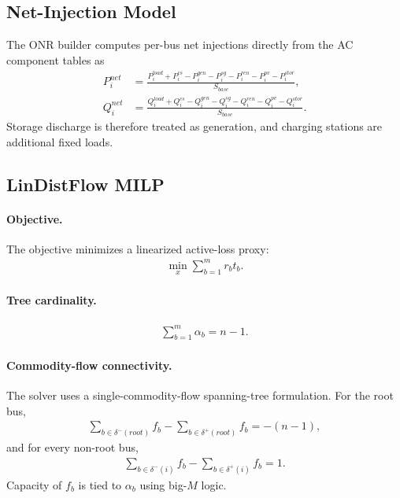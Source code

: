 \subsection{Net-Injection Model}

The ONR builder computes per-bus net injections directly from the AC component
tables as
\begin{align}
P_i^{net} &= \frac{P_i^{load} + P_i^{cs} - P_i^{gen} - P_i^{sg} - P_i^{ren} - P_i^{pv} - P_i^{stor}}{S_{base}}, \\
Q_i^{net} &= \frac{Q_i^{load} + Q_i^{cs} - Q_i^{gen} - Q_i^{sg} - Q_i^{ren} - Q_i^{pv} - Q_i^{stor}}{S_{base}}.
\end{align}
Storage discharge is therefore treated as generation, and charging stations are
additional fixed loads.

\subsection{LinDistFlow MILP}

\paragraph{Objective.}
The objective minimizes a linearized active-loss proxy:
\begin{align}
\min_x \sum_{b=1}^{m} r_b t_b.
\end{align}

\paragraph{Tree cardinality.}
\begin{align}
\sum_{b=1}^{m} \alpha_b = n-1.
\end{align}

\paragraph{Commodity-flow connectivity.}
The solver uses a single-commodity-flow spanning-tree formulation.  For the root
bus,
\begin{align}
\sum_{b\in\delta^{-}(root)} f_b - \sum_{b\in\delta^{+}(root)} f_b = -(n-1),
\end{align}
and for every non-root bus,
\begin{align}
\sum_{b\in\delta^{-}(i)} f_b - \sum_{b\in\delta^{+}(i)} f_b = 1.
\end{align}
Capacity of \(f_b\) is tied to \(\alpha_b\) using big-\(M\) logic.


